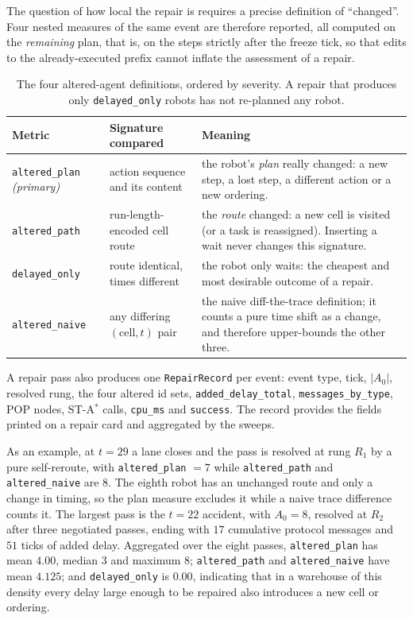 \documentclass[10pt,a4paper]{article}
\newcommand{\code}[1]{\texttt{#1}}
\begin{document}
The question of how local the repair is requires a precise definition of
``changed''.  Four nested measures of the same event are therefore reported,
all computed on the \emph{remaining} plan, that is, on the steps strictly
after the freeze tick, so that edits to the already-executed prefix cannot
inflate the assessment of a repair.

\begin{table}[H]
\centering
\small
\begin{tabularx}{\textwidth}{@{}l l X@{}}
\toprule
\textbf{Metric} & \textbf{Signature compared} & \textbf{Meaning}\\
\midrule
\code{altered\_plan} \emph{(primary)} & action sequence and its content &
  the robot's \emph{plan} really changed: a new step, a lost step, a
  different action or a new ordering.\\
\code{altered\_path} & run-length-encoded cell route &
  the \emph{route} changed: a new cell is visited (or a task is reassigned).
  Inserting a wait never changes this signature.\\
\code{delayed\_only} & route identical, times different &
  the robot only waits: the cheapest and most desirable outcome of a
  repair.\\
\code{altered\_naive} & any differing $(\text{cell}, t)$ pair &
  the naive diff-the-trace definition; it counts a pure time shift as a
  change, and therefore upper-bounds the other three.\\
\bottomrule
\end{tabularx}
\caption{The four altered-agent definitions, ordered by severity.  A repair
that produces only \code{delayed\_only} robots has not re-planned any robot.}
\label{tab:altered}
\end{table}

A repair pass also produces one \code{RepairRecord} per event: event type,
tick, $|A_0|$, resolved rung, the four altered id sets,
\code{added\_delay\_total}, \code{messages\_by\_type}, POP nodes, ST-A$^\ast$
calls, \code{cpu\_ms} and \code{success}.  The record provides the fields
printed on a repair card and aggregated by the sweeps.

As an example, at $t=29$ a lane closes and the pass is resolved at rung
$R_1$ by a pure self-reroute, with \code{altered\_plan} $=7$ while
\code{altered\_path} and \code{altered\_naive} are $8$.  The eighth robot has
an unchanged route and only a change in timing, so the plan measure excludes
it while a naive trace difference counts it.  The largest pass is the $t=22$
accident, with $A_0=8$, resolved at $R_2$ after three negotiated passes,
ending with $17$ cumulative protocol messages and $51$ ticks of added delay.
Aggregated over the eight passes, \code{altered\_plan} has mean $4.00$,
median $3$ and maximum $8$; \code{altered\_path} and \code{altered\_naive}
have mean $4.125$; and \code{delayed\_only} is $0.00$, indicating that in a
warehouse of this density every delay large enough to be repaired also
introduces a new cell or ordering.
\end{document}
